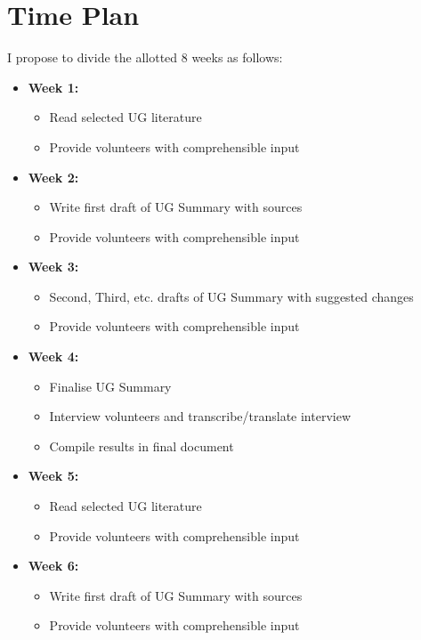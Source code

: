 \documentclass[a4paper,10pt]{article}
\begin{document}
\section{Time Plan}
I propose to divide the allotted 8 weeks as follows:
\begin{itemize}
    \item \textbf{Week 1:}
        \begin{itemize}
        \item Read selected UG literature
        \item Provide volunteers with comprehensible input
        \end{itemize}
    \item \textbf{Week 2:}
        \begin{itemize}
        \item Write first draft of UG Summary with sources
        \item Provide volunteers with comprehensible input
        \end{itemize}
    \item \textbf{Week 3:}
        \begin{itemize}
        \item Second, Third, etc. drafts of UG Summary with suggested changes
        \item Provide volunteers with comprehensible input
        \end{itemize}
    \item \textbf{Week 4:}
        \begin{itemize}
        \item Finalise UG Summary
        \item Interview volunteers and transcribe/translate interview
        \item Compile results in final document
        \end{itemize}
    \item \textbf{Week 5:}
        \begin{itemize}
            \item Read selected UG literature
            \item Provide volunteers with comprehensible input
        \end{itemize}
    \item \textbf{Week 6:}
        \begin{itemize}
            \item Write first draft of UG Summary with sources
            \item Provide volunteers with comprehensible input

\end{itemize}
\end{itemize}
\end{document}
